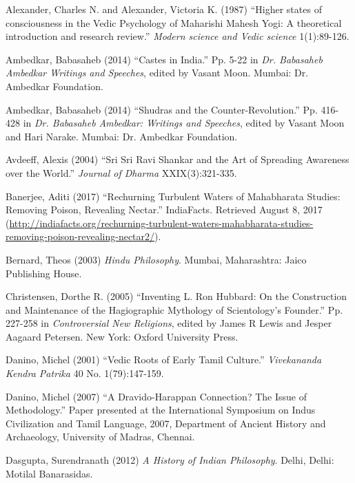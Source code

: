 \begin{thebibliography}{99}
 Alexander, Charles N. and Alexander, Victoria K. (1987) “Higher states of consciousness in the Vedic Psychology of Maharishi Mahesh Yogi: A theoretical introduction and research review.” \textit{Modern science and Vedic science} 1(1):89-126.

  Ambedkar, Babasaheb (2014) “Castes in India.” Pp. 5-22 in \textit{Dr. Babasaheb Ambedkar Writings and Speeches}, edited by Vasant Moon. Mumbai: Dr. Ambedkar Foundation.

  Ambedkar, Babasaheb (2014) “Shudras and the Counter-Revolution.” Pp. 416-428 in \textit{Dr. Babasaheb Ambedkar: Writings and Speeches}, edited by Vasant Moon and Hari Narake. Mumbai: Dr. Ambedkar Foundation.

  Avdeeff, Alexis (2004) “Sri Sri Ravi Shankar and the Art of Spreading Awareness over the World.” \textit{Journal of Dharma} XXIX(3):321-335.

  Banerjee, Aditi (2017) “Rechurning Turbulent Waters of Mahabharata Studies: Removing Poison, Revealing Nectar.” IndiaFacts. Retrieved August 8, 2017 (\url{http://indiafacts.org/rechurning-turbulent-waters-mahabharata-studies-removing-poison-revealing-nectar2/}).

  Bernard, Theos (2003) \textit{Hindu Philosophy}. Mumbai, Maharashtra: Jaico Publishing House.

  Christensen, Dorthe R. (2005) “Inventing L. Ron Hubbard: On the Construction and Maintenance of the Hagiographic Mythology of Scientology's Founder.” Pp. 227-258 in \textit{Controversial New Religions}, edited by James R Lewis and Jesper Aagaard Petersen. New York: Oxford University Press.

  Danino, Michel (2001) “Vedic Roots of Early Tamil Culture.” \textit{Vivekananda Kendra Patrika} 40 No. 1(79):147-159.

  Danino, Michel (2007) “A Dravido-Harappan Connection? The Issue of Methodology.” Paper presented at the International Symposium on Indus Civilization and Tamil Language, 2007, Department of Ancient History and Archaeology, University of Madras, Chennai.

  Dasgupta, Surendranath (2012) \textit{A History of Indian Philosophy}. Delhi, Delhi: Motilal Banarasidas.


\end{thebibliography}
